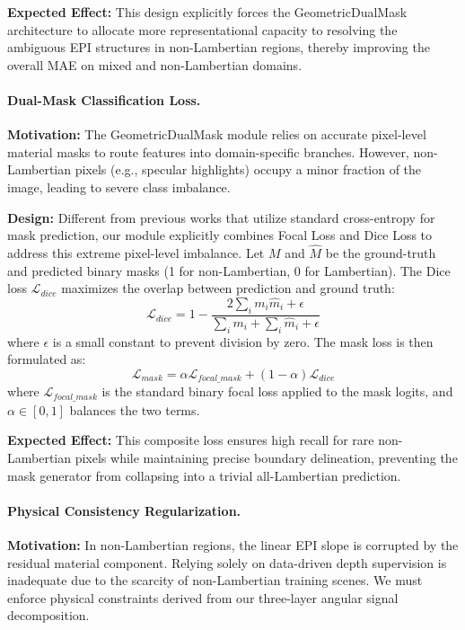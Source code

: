 \textbf{Expected Effect:} This design explicitly forces the GeometricDualMask architecture to allocate more representational capacity to resolving the ambiguous EPI structures in non-Lambertian regions, thereby improving the overall MAE on mixed and non-Lambertian domains.

\paragraph{Dual-Mask Classification Loss.}
\textbf{Motivation:} The GeometricDualMask module relies on accurate pixel-level material masks to route features into domain-specific branches. However, non-Lambertian pixels (e.g., specular highlights) occupy a minor fraction of the image, leading to severe class imbalance.

\textbf{Design:} Different from previous works that utilize standard cross-entropy for mask prediction, our module explicitly combines Focal Loss and Dice Loss to address this extreme pixel-level imbalance. Let $M$ and $\hat{M}$ be the ground-truth and predicted binary masks (1 for non-Lambertian, 0 for Lambertian). The Dice loss $\mathcal{L}_{dice}$ maximizes the overlap between prediction and ground truth:
\begin{equation}
\label{eq:eq18}
\mathcal{L}_{dice} = 1 - \frac{2 \sum_{i} m_i \hat{m}_i + \epsilon}{\sum_{i} m_i + \sum_{i} \hat{m}_i + \epsilon}
\end{equation}
where $\epsilon$ is a small constant to prevent division by zero. The mask loss is then formulated as:
\begin{equation}
\label{eq:eq19}
\mathcal{L}_{mask} = \alpha \mathcal{L}_{focal\_mask} + (1 - \alpha) \mathcal{L}_{dice}
\end{equation}
where $\mathcal{L}_{focal\_mask}$ is the standard binary focal loss applied to the mask logits, and $\alpha \in [0, 1]$ balances the two terms. 

\textbf{Expected Effect:} This composite loss ensures high recall for rare non-Lambertian pixels while maintaining precise boundary delineation, preventing the mask generator from collapsing into a trivial all-Lambertian prediction.

\paragraph{Physical Consistency Regularization.}
\textbf{Motivation:} In non-Lambertian regions, the linear EPI slope is corrupted by the residual material component. Relying solely on data-driven depth supervision is inadequate due to the scarcity of non-Lambertian training scenes. We must enforce physical constraints derived from our three-layer angular signal decomposition.

